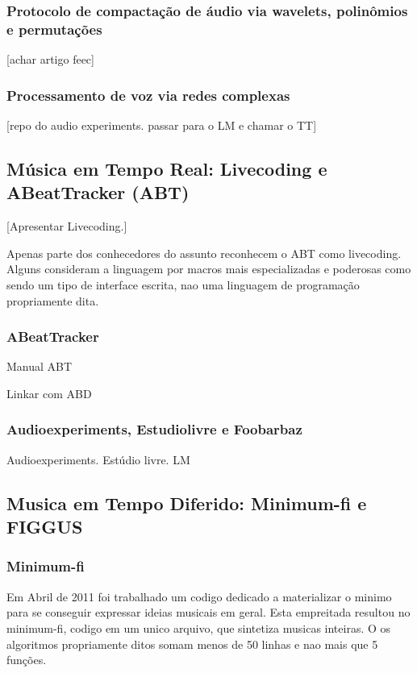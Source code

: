       \subsubsection{Protocolo de compactação de áudio via wavelets, polinômios e permutações}
      [achar artigo feec]


      \subsubsection{Processamento de voz via redes complexas}
      [repo do audio experiments. passar para o LM e chamar o TT]
  

  \subsection{Música em Tempo Real: Livecoding e ABeatTracker (ABT)}

  [Apresentar Livecoding.]

  Apenas parte dos conhecedores do assunto reconhecem
  o ABT como livecoding. Alguns
  consideram a linguagem por macros mais especializadas e poderosas como
  sendo um tipo de interface escrita, nao uma linguagem de programação
  propriamente dita.

      \subsubsection{ABeatTracker}


  Manual ABT

  Linkar com ABD

      \subsubsection{Audioexperiments, Estudiolivre e Foobarbaz}

      Audioexperiments. Estúdio livre. LM




  \subsection{Musica em Tempo Diferido: Minimum-fi e FIGGUS}

      \subsubsection{Minimum-fi}

Em Abril de 2011 foi trabalhado um codigo dedicado a materializar o minimo
para se conseguir expressar ideias musicais em geral. Esta empreitada
resultou no minimum-fi, codigo em um unico arquivo, que sintetiza
musicas inteiras. O os algoritmos propriamente ditos somam menos de
50 linhas e nao mais que 5 funções.

